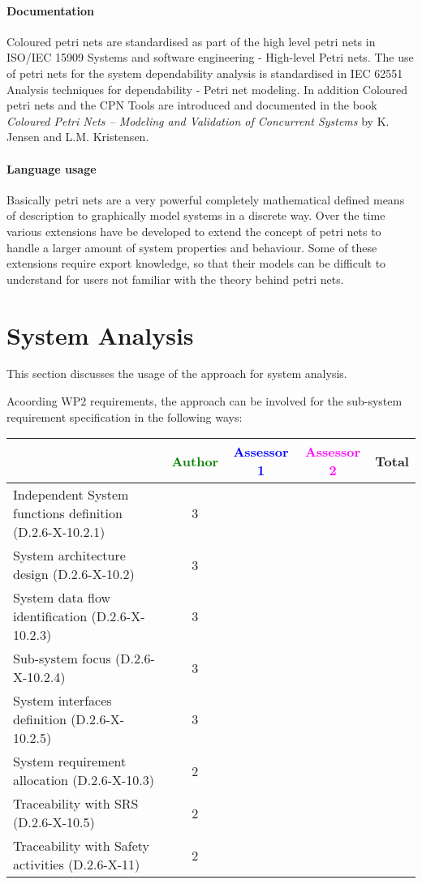 \paragraph{Documentation} Coloured petri nets are standardised as part of the high level petri nets in ISO/IEC 15909 Systems and software engineering - High-level Petri nets. The use of petri nets for the system dependability analysis is standardised in IEC 62551 Analysis techniques for dependability - Petri net modeling. In addition Coloured petri nets and the CPN Tools are introduced and documented in the book \textit{Coloured Petri Nets -- Modeling and Validation of Concurrent Systems} by K. Jensen and L.M. Kristensen. 

\paragraph{Language usage} Basically petri nets are a very powerful completely mathematical defined means of description to graphically model systems in a discrete way. Over the time various extensions have be developed to extend the concept of petri nets to handle a larger amount of system properties and  behaviour. Some of these extensions require export knowledge, so that their models can be difficult to understand for users not familiar with the theory behind petri nets.

\section{System Analysis}
This section discusses the usage of the approach for system analysis.

Acoording WP2 requirements, the approach can be involved for the sub-system requirement specification in the following ways:

\begin{tabular}{|l | c | c | c | c|}
\hline
& \textcolor{green}{Author} & \textcolor{blue}{Assessor 1} & \textcolor{magenta}{Assessor 2} & Total \\
\hline
Independent System functions definition (D.2.6-X-10.2.1)  & 3 & & &  \\
\hline 
System architecture design (D.2.6-X-10.2) & 3 & & &  \\
\hline
System data flow identification (D.2.6-X-10.2.3)  & 3 & & &  \\
\hline
Sub-system focus (D.2.6-X-10.2.4)  & 3 & & &  \\
\hline
System interfaces definition (D.2.6-X-10.2.5)  & 3 & & &  \\
\hline
System requirement allocation (D.2.6-X-10.3)  & 2 & & &  \\
\hline
Traceability with SRS (D.2.6-X-10.5)  & 2 & & &  \\
\hline
Traceability with Safety activities (D.2.6-X-11)  & 2 & & &  \\
\hline
\end{tabular}



